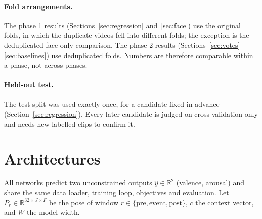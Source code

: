 \documentclass[11pt]{article}
\begin{document}
\paragraph{Fold arrangements.} The phase 1 results (Sections~\ref{sec:regression} and~\ref{sec:face}) use the original folds, in which the duplicate videos fell into different folds; the exception is the deduplicated face-only comparison. The phase 2 results (Sections~\ref{sec:votes}--\ref{sec:baselines}) use deduplicated folds. Numbers are therefore comparable within a phase, not across phases.

\paragraph{Held-out test.} The test split was used exactly once, for a candidate fixed in advance (Section~\ref{sec:regression}). Every later candidate is judged on cross-validation only and needs new labelled clips to confirm it.

\section{Architectures}\label{sec:arch}

All networks predict two unconstrained outputs $\hat{y} \in \mathbb{R}^2$ (valence, arousal) and share the same data loader, training loop, objectives and evaluation. Let $P_r \in \mathbb{R}^{32 \times J \times F}$ be the pose of window $r \in \{\text{pre}, \text{event}, \text{post}\}$, $c$ the context vector, and $W$ the model width.
\end{document}
